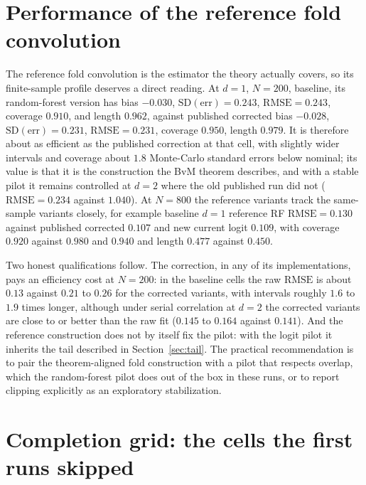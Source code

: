\documentclass[11pt]{article}
\begin{document}
\section{Performance of the reference fold convolution}
\label{sec:reference}

The reference fold convolution is the estimator the theory actually covers, so its
finite-sample profile deserves a direct reading. At $d=1$, $N=200$, baseline, its
random-forest version has bias $-0.030$, $\mathrm{SD(err)}=0.243$,
$\mathrm{RMSE}=0.243$, coverage $0.910$, and length $0.962$, against published corrected
bias $-0.028$, $\mathrm{SD(err)}=0.231$, $\mathrm{RMSE}=0.231$, coverage $0.950$,
length $0.979$. It is therefore about as efficient as the published correction at that
cell, with slightly wider intervals and coverage about $1.8$ Monte-Carlo standard errors
below nominal; its value is that it is the construction the BvM theorem describes, and
with a stable pilot it remains controlled at $d=2$ where the old published run did not
($\mathrm{RMSE}=0.234$ against $1.040$). At $N=800$ the reference variants track the
same-sample variants closely, for example baseline $d=1$ reference RF
$\mathrm{RMSE}=0.130$ against published corrected $0.107$ and new current logit $0.109$,
with coverage $0.920$ against $0.980$ and $0.940$ and length $0.477$ against $0.450$.

Two honest qualifications follow. The correction, in any of its implementations, pays
an efficiency cost at $N=200$: in the baseline cells the raw $\mathrm{RMSE}$ is about
$0.13$ against $0.21$ to $0.26$ for the corrected variants, with intervals roughly
$1.6$ to $1.9$ times longer, although under serial correlation at $d=2$ the corrected
variants are close to or better than the raw fit ($0.145$ to $0.164$ against $0.141$).
And the reference construction does not by itself fix the pilot: with the logit pilot it
inherits the tail described in Section~\ref{sec:tail}. The practical recommendation is
to pair the theorem-aligned fold construction with a pilot that respects overlap, which
the random-forest pilot does out of the box in these runs, or to report clipping
explicitly as an exploratory stabilization.

\section{Completion grid: the cells the first runs skipped}
\label{sec:completion}
\end{document}
